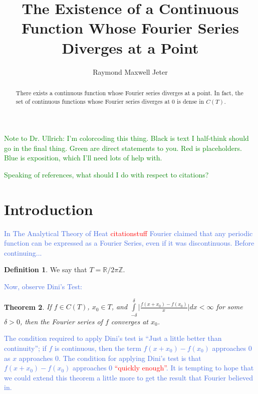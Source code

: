 \documentclass{amsart}
\newcommand{\de}{\delta}
\newcommand{\R}{\mathbb{R}}
\newcommand{\Z}{\mathbb{Z}}
\newcommand{\colorcomment}[2]{\textcolor{#1}{#2}} %
\newcommand{\absval}[1]{\lvert #1 \rvert}
\newtheorem{thm}{Theorem}[section]
\theoremstyle{definition}
\newtheorem{definition}[thm]{Definition}
\begin{document}
\title{The Existence of a Continuous Function Whose Fourier Series Diverges at a Point}
\author{Raymond Maxwell Jeter}

\begin{abstract}
There exists a continuous function whose Fourier series diverges at a point. 
In fact, the set of continuous functions whose Fourier series diverges at $0$ is dense in $C(T)$.
\end{abstract}

\maketitle

\colorcomment{Green}{Note to Dr. Ullrich: I'm colorcoding this thing. Black is text I half-think should go in the final thing. Green are direct statements to you. Red is placeholders. Blue is exposition, which I'll need lots of help with.}

\colorcomment{Green}{Speaking of references, what should I do with respect to citations?}

\section{Introduction}


\colorcomment{RoyalBlue}{In The Analytical Theory of Heat \colorcomment{red}{citationstuff} Fourier claimed that any periodic function can be expressed as a Fourier Series, even if it was discontinuous. 
Before continuing...}

\begin{definition}
We say that $T = \R / 2\pi \Z$.
\end{definition}

\colorcomment{RoyalBlue}{Now, observe Dini's Test:}

\begin{thm}
If $f \in C(T)$, $x_0 \in T$, and $\int\limits_{-\de}^{\de} \absval{\frac{f(x+x_0) - f(x_0)}{x}} dx < \infty$ for some $\de >0$, then the Fourier series of $f$ converges at $x_0$.
\end{thm}

\colorcomment{RoyalBlue}{The condition required to apply Dini's test is ``Just a little better than continuity''; if $f$ is continuous, then the term $f(x+x_0) - f(x_0)$ approaches $0$ as $x$ approaches $0$.
The condition for applying Dini's test is that $f(x+x_0) - f(x_0)$ approaches $0$ \colorcomment{red}{``quickly enough''}.
It is tempting to hope that we could extend this theorem a little more to get the result that Fourier believed in.}
\end{document}
